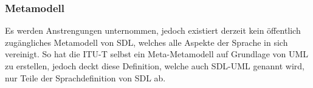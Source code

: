 \subsubsection{Metamodell}
\label{ssc:Metamodell}
Es werden Anstrengungen unternommen, jedoch existiert derzeit kein öffentlich zugängliches Metamodell von \ac{SDL}, welches alle 
Aspekte der Sprache in sich vereinigt. So hat die \ac{ITU-T} selbst ein Meta-Metamodell auf Grundlage von 
\ac{UML} zu erstellen, jedoch deckt diese Definition, welche auch SDL-UML genannt wird, nur Teile der Sprachdefinition von \ac{SDL} 
ab.
